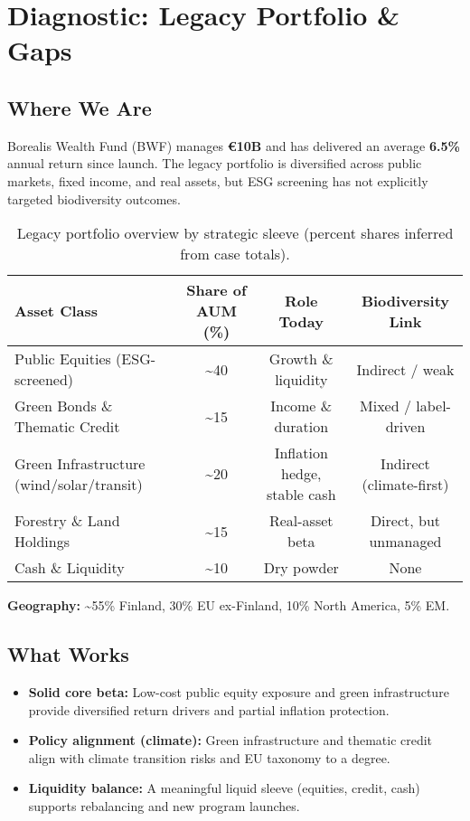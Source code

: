 \section*{Diagnostic: Legacy Portfolio \& Gaps}

\subsection*{Where We Are}
Borealis Wealth Fund (BWF) manages \textbf{€10B} and has delivered an average \textbf{6.5\%} annual return since launch. The legacy portfolio is diversified across public markets, fixed income, and real assets, but ESG screening has not explicitly targeted biodiversity outcomes.

\begin{table}[h!]
\centering
\begin{tabular}{lccc}
\toprule
\textbf{Asset Class} & \textbf{Share of AUM (\%)} & \textbf{Role Today} & \textbf{Biodiversity Link} \\
\midrule
Public Equities (ESG-screened) & \textasciitilde 40 & Growth \& liquidity & Indirect / weak \\
Green Bonds \& Thematic Credit & \textasciitilde 15 & Income \& duration & Mixed / label-driven \\
Green Infrastructure (wind/solar/transit) & \textasciitilde 20 & Inflation hedge, stable cash & Indirect (climate-first) \\
Forestry \& Land Holdings & \textasciitilde 15 & Real-asset beta & Direct, but unmanaged \\
Cash \& Liquidity & \textasciitilde 10 & Dry powder & None \\
\bottomrule
\end{tabular}
\caption{Legacy portfolio overview by strategic sleeve (percent shares inferred from case totals).}
\end{table}

\noindent \textbf{Geography:} \textasciitilde 55\% Finland, 30\% EU ex-Finland, 10\% North America, 5\% EM.

\vspace{0.5em}
\subsection*{What Works}
\begin{itemize}[leftmargin=*, itemsep=2pt]
    \item \textbf{Solid core beta:} Low-cost public equity exposure and green infrastructure provide diversified return drivers and partial inflation protection.
    \item \textbf{Policy alignment (climate):} Green infrastructure and thematic credit align with climate transition risks and EU taxonomy to a degree.
    \item \textbf{Liquidity balance:} A meaningful liquid sleeve (equities, credit, cash) supports rebalancing and new program launches.
\end{itemize}

